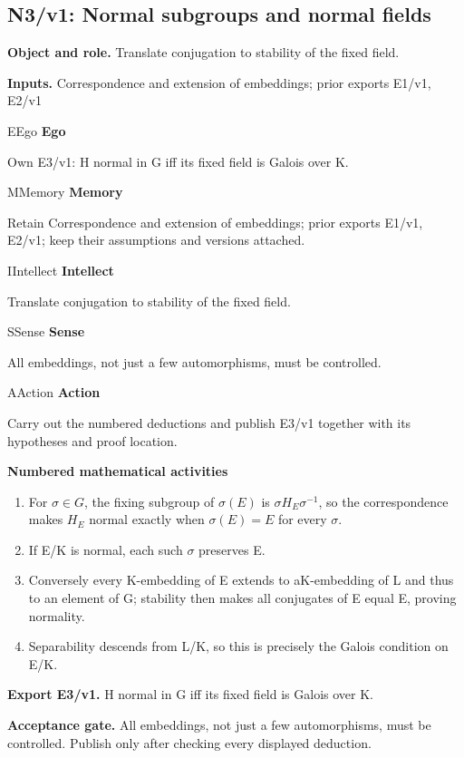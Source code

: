 \documentclass[preprint,12pt,aps,pra,showkeys,amsmath,amssymb,superscriptaddress,floatfix]{revtex4-2}
\theoremstyle{definition}
\theoremstyle{remark}
\newcommand{\mmfaculty}[3]{%
 \begin{mmfacultybox}{#1}{#2}
 {\sffamily\bfseries\color{MMBlue}#2}\par\smallskip #3
 \end{mmfacultybox}}
\newcommand{\field}[2]{\par\smallskip\noindent\textbf{#1.} #2\par}
\begin{document}
\clearpage

\subsection{N3/v1: Normal subgroups and normal fields}

\field{Object and role}{Translate conjugation to stability of the fixed field.}

\field{Inputs}{Correspondence and extension of embeddings; prior exports E1/v1, E2/v1}

\mmfaculty{E}{Ego}{Own E3/v1: H normal in G iff its fixed field is Galois over K.}

\mmfaculty{M}{Memory}{Retain Correspondence and extension of embeddings; prior exports E1/v1,
E2/v1; keep their assumptions and versions attached.}

\mmfaculty{I}{Intellect}{Translate conjugation to stability of the fixed field.}

\mmfaculty{S}{Sense}{All embeddings, not just a few automorphisms, must be controlled.}

\mmfaculty{A}{Action}{Carry out the numbered deductions and publish E3/v1 together with its
hypotheses and proof location.}

\smallskip\noindent\textbf{Numbered mathematical activities}

\begin{enumerate}[label=N3.\arabic*,leftmargin=3.4em]

\item For \(\sigma \in G\), the fixing subgroup of \(\sigma (E)\) is
\(\sigma H_E\sigma ^{-1}\), so the correspondence makes \(H_E\) normal
exactly when \(\sigma (E)=E\) for every \(\sigma\).

\item If E/K is normal, each such \(\sigma\) preserves E.

\item Conversely every K-embedding of E extends to aK-embedding of L and thus
to an element of G; stability then makes all conjugates of E equal E,
proving normality.

\item Separability descends from L/K, so this is precisely the Galois
condition on E/K.

\end{enumerate}

\field{Export E3/v1}{H normal in G iff its fixed field is Galois over K.}

\field{Acceptance gate}{All embeddings, not just a few automorphisms, must be controlled.
Publish only after checking every displayed deduction.}
\end{document}
